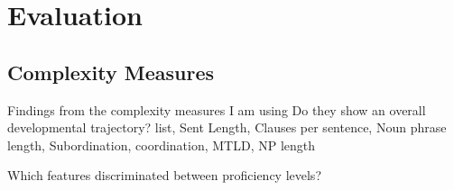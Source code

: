 \chapter{Evaluation} 

\section{Complexity Measures}
Findings from the complexity measures I am using
Do they show an overall developmental trajectory?
list, Sent Length, Clauses per sentence, Noun phrase length,  Subordination, coordination, MTLD, NP length

Which features discriminated between proficiency levels?

